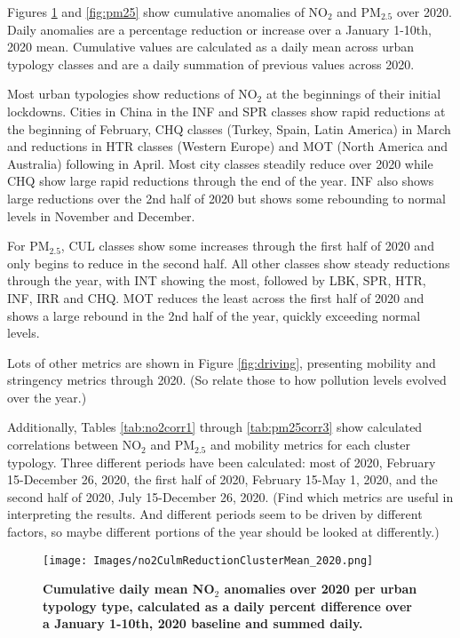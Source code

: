 \documentclass[preprint,12pt]{elsarticle}
\begin{document}
Figures \ref{fig:no2} and \ref{fig:pm25} show cumulative anomalies of NO$_{2}$ and PM$_{2.5}$ over 2020. Daily anomalies are a percentage reduction or increase over a January 1-10th, 2020 mean. Cumulative values are calculated as a daily mean across urban typology classes and are a daily summation of previous values across 2020.

Most urban typologies show reductions of NO$_{2}$ at the beginnings of their initial lockdowns. Cities in China in the INF and SPR classes show rapid reductions at the beginning of February, CHQ classes (Turkey, Spain, Latin America) in March and reductions in HTR classes (Western Europe) and MOT (North America and Australia) following in April. Most city classes steadily reduce over 2020 while CHQ show large rapid reductions through the end of the year. INF also shows large reductions over the 2nd half of 2020 but shows some rebounding to normal levels in November and December.

For PM$_{2.5}$, CUL classes show some increases through the first half of 2020 and only begins to reduce in the second half. All other classes show steady reductions through the year, with INT showing the most, followed by LBK, SPR, HTR, INF, IRR and CHQ. MOT reduces the least across the first half of 2020 and shows a large rebound in the 2nd half of the year, quickly exceeding normal levels.

Lots of other metrics are shown in Figure \ref{fig:driving}, presenting mobility and stringency metrics through 2020. (So relate those to how pollution levels evolved over the year.)

Additionally, Tables \ref{tab:no2corr1} through \ref{tab:pm25corr3} show calculated correlations between NO$_{2}$ and PM$_{2.5}$ and mobility metrics for each cluster typology. Three different periods have been calculated: most of 2020, February 15-December 26, 2020, the first half of 2020, February 15-May 1, 2020, and the second half of 2020, July 15-December 26, 2020. (Find which metrics are useful in interpreting the results. And different periods seem to be driven by different factors, so maybe different portions of the year should be looked at differently.)


\begin{figure}
\centering
\texttt{[image: Images/no2CulmReductionClusterMean\_2020.png]}
\caption{\bf Cumulative daily mean NO$_{2}$ anomalies over 2020 per urban typology type, calculated as a daily percent difference over a January 1-10th, 2020 baseline and summed daily. }
 \label{fig:no2}
\end{figure}
\end{document}
